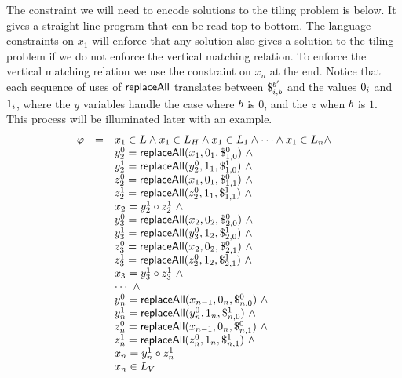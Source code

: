 \documentclass{article}
\newcommand{\concat} {\circ}
\begin{document}
The constraint we will need to encode solutions to the tiling problem is below.
It gives a straight-line program that can be read top to bottom.
The language constraints on $x_1$ will enforce that any solution also gives a solution to the tiling problem if we do not enforce the vertical matching relation.
To enforce the vertical matching relation we use the constraint on $x_n$ at the end.
Notice that each sequence of uses of $\replaceall$ translates between
$\repl{i}{\bit}{\bit'}$
and the values $\nbit{i}{0}$ and $\nbit{i}{1}$, where the $y$ variables handle the case where $\bit$ is $0$, and the $z$ when $\bit$ is $1$.
This process will be illuminated later with an example.
\[
    \begin{array}{rcl}
        \varphi &=& x_1 \in L \land
                    x_1 \in L_\hcons \land
                    x_1 \in L_1 \land
                    \cdots \land
                    x_1 \in L_n \land \\
                & & y^0_2 = \replaceall(x_1, \nbit{1}{0}, \repl{1}{0}{0}) \ \land \\
                & & y^1_2 = \replaceall(y^0_2, \nbit{1}{1}, \repl{1}{0}{1}) \ \land \\
                & & z^0_2 = \replaceall(x_1, \nbit{1}{0}, \repl{1}{1}{0}) \ \land \\
                & & z^1_2 = \replaceall(z^0_2, \nbit{1}{1}, \repl{1}{1}{1}) \ \land \\
                & & x_2 = y^1_2 \concat z^1_2 \ \land \\
                & & y^0_3 = \replaceall(x_2, \nbit{2}{0}, \repl{2}{0}{0}) \ \land \\
                & & y^1_3 = \replaceall(y^0_3, \nbit{2}{1}, \repl{2}{0}{1}) \ \land \\
                & & z^0_3 = \replaceall(x_2, \nbit{2}{0}, \repl{2}{1}{0}) \ \land \\
                & & z^1_3 = \replaceall(z^0_2, \nbit{2}{1}, \repl{2}{1}{1}) \ \land \\
                & & x_3 = y^1_3 \concat z^1_3 \ \land \\
                & & \cdots \ \land \\
                & & y^0_n = \replaceall(x_{n-1}, \nbit{n}{0}, \repl{n}{0}{0}) \ \land \\
                & & y^1_n = \replaceall(y^0_n, \nbit{n}{1}, \repl{n}{0}{1}) \ \land \\
                & & z^0_n = \replaceall(x_{n-1}, \nbit{n}{0}, \repl{n}{1}{0}) \ \land \\
                & & z^1_n = \replaceall(z^0_n, \nbit{n}{1}, \repl{n}{1}{1}) \ \land \\
                & & x_n = y^1_n \concat z^1_n \\

                & & x_n \in L_\vcons
    \end{array}
\]
\end{document}
